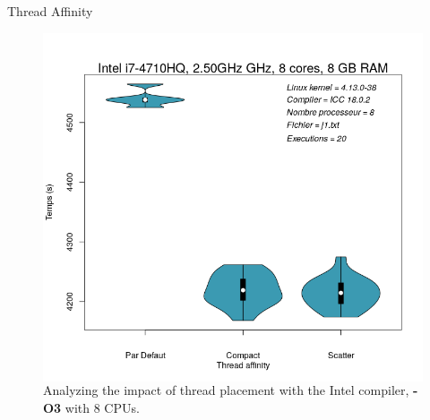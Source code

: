 \documentclass{beamer}
\begin{document}
\begin{frame}{Thread Affinity}
	\begin{figure}
	\begin{columns}
      \caption{Analyzing the impact of thread placement with the Intel compiler, \textbf{-O3} with 8 CPUs.\label{Fig:thread_affinity}}
      \includegraphics[width=\textwidth]{defaultVSscatterVScompact.png}
    \end{columns}	
	\end{figure}
\end{frame}
\end{document}
